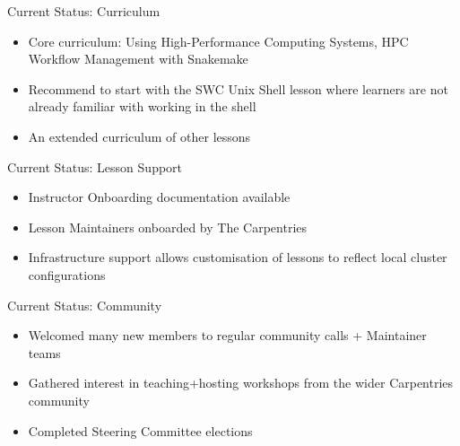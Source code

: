 \begin{frame}{Current Status: Curriculum}
	\begin{itemize}
		\item Core curriculum: Using High-Performance Computing Systems, HPC Workflow Management with Snakemake
		\item Recommend to start with the SWC Unix Shell lesson where learners are not already familiar with working in the shell
		\item An extended curriculum of other lessons
	\end{itemize}
\note{}
\end{frame}

\begin{frame}{Current Status: Lesson Support}
	\begin{itemize}
		\item Instructor Onboarding documentation available
		\item Lesson Maintainers onboarded by The Carpentries
		\item Infrastructure support allows customisation of lessons to reflect local cluster configurations
	\end{itemize}
\note{}
\end{frame}

\begin{frame}{Current Status: Community}
	\begin{itemize}
		\item Welcomed many new members to regular community calls + Maintainer teams
		\item Gathered interest in teaching+hosting workshops from the wider Carpentries community
		\item Completed Steering Committee elections
	\end{itemize}
\note{}
\end{frame}